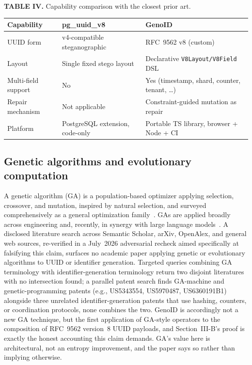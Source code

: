 \documentclass[conference]{IEEEtran}
\begin{document}
\begin{center}
\scriptsize
\textbf{TABLE IV.} Capability comparison with the closest prior art.

\vspace{0.3em}

\begin{tabularx}{\columnwidth}{@{}lXX@{}}
\hline
\textbf{Capability} & \textbf{pg\_uuid\_v8} & \textbf{GenoID} \\
\hline
UUID form &
v4-compatible steganographic &
RFC~9562 v8 (custom) \\

Layout &
Single fixed stego layout &
Declarative \texttt{V8Layout/}\allowbreak\texttt{V8Field} DSL \\

Multi-field support &
No &
Yes (timestamp, shard, counter, tenant, \ldots) \\

Repair mechanism &
Not applicable &
Constraint-guided mutation as repair \\

Platform &
PostgreSQL extension, code-only &
Portable TS library, browser + Node + CI \\
\hline
\end{tabularx}
\end{center}

\subsection{Genetic algorithms and evolutionary computation}
A genetic algorithm (GA) is a population-based optimizer applying selection, crossover, and mutation, inspired by natural selection, and surveyed comprehensively as a general optimization family~\cite{9,10,11}. GAs are applied broadly across engineering and, recently, in synergy with large language models~\cite{19}. A disclosed literature search across Semantic Scholar, arXiv, OpenAlex, and general web sources, re-verified in a July~2026 adversarial recheck aimed specifically at falsifying this claim, surfaces no academic paper applying genetic or evolutionary algorithms to UUID or identifier generation. Targeted queries combining GA terminology with identifier-generation terminology return two disjoint literatures with no intersection found; a parallel patent search finds GA-machine and genetic-programming patents (e.g., US5343554, US5970487, US6360191B1) alongside three unrelated identifier-generation patents that use hashing, counters, or coordination protocols, none combines the two. GenoID is accordingly not a new GA technique, but the first application of GA-style operators to the composition of RFC~9562 version~8 UUID payloads, and Section~III-B's proof is exactly the honest accounting this claim demands. GA's value here is architectural, not an entropy improvement, and the paper says so rather than implying otherwise.
\end{document}
